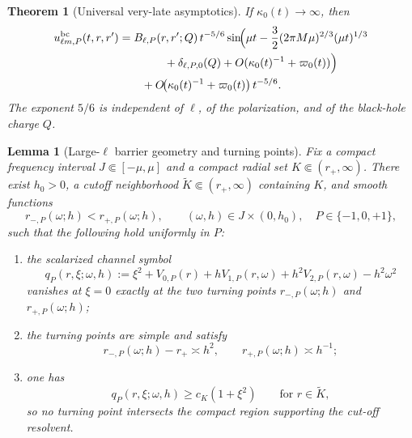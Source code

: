 \documentclass[10pt,a4paper]{amsart}
\newtheorem{theorem}{Theorem}
\newtheorem{lemma}{Lemma}
\newcommand{\bc}{\mathrm{bc}}
\newcommand{\kap}{\kappa}
\newcommand{\om}{\omega}
\newcommand{\vp}{\varpi}
\begin{document}
\begin{theorem}[Universal very-late asymptotics]\label{thm:late}
If $\kap_0(t)\to\infty$, then
\begin{align}\label{eq:late_explicit_sine}
   u_{\ell m,P}^{\bc}(t,r,r')
   &=
   B_{\ell,P}(r,r';Q)\,t^{-5/6}
   \sin\!\Bigl(
      \mu t
      -\frac32(2\pi M\mu)^{2/3}(\mu t)^{1/3}
      \notag\\
   &\qquad\qquad
      +\delta_{\ell,P,0}(Q)
      +O(\kap_0(t)^{-1}+\vp_0(t))
   \Bigr)
   \notag\\
   &\qquad
   +O\!\bigl(\kap_0(t)^{-1}+\vp_0(t)\bigr)\,t^{-5/6}.
\end{align}
The exponent $5/6$ is independent of $\ell$, of the polarization, and of the black-hole charge $Q$.
\end{theorem}

\begin{lemma}[Large-$\ell$ barrier geometry and turning points]\label{lem:largeell_barrier}
Fix a compact frequency interval $J\Subset[-\mu,\mu]$ and a compact radial set $K\Subset(r_+,\infty)$.  There exist $h_0>0$, a cutoff neighborhood $\widetilde K\Subset(r_+,\infty)$ containing $K$, and smooth functions
\[
   r_{-,P}(\om;h)<r_{+,P}(\om;h),
   \qquad
   (\om,h)\in J\times(0,h_0),
   \quad P\in\{-1,0,+1\},
\]
such that the following hold uniformly in $P$:
\begin{enumerate}[label=\textnormal{(\roman*)}]
   \item the scalarized channel symbol
   \[
      q_{P}(r,\xi;\om,h)
      :=
      \xi^2+V_{0,P}(r)+hV_{1,P}(r,\om)+h^2V_{2,P}(r,\om)-h^2\om^2
   \]
   vanishes at $\xi=0$ exactly at the two turning points $r_{-,P}(\om;h)$ and $r_{+,P}(\om;h)$;
   \item the turning points are simple and satisfy
   \[
      r_{-,P}(\om;h)-r_+\asymp h^2,
      \qquad
      r_{+,P}(\om;h)\asymp h^{-1};
   \]
   \item one has
   \[
      q_P(r,\xi;\om,h)\ge c_K(1+\xi^2)
      \qquad\text{for }r\in\widetilde K,
   \]
   so no turning point intersects the compact region supporting the cut-off resolvent.
\end{enumerate}
\end{lemma}
\end{document}
